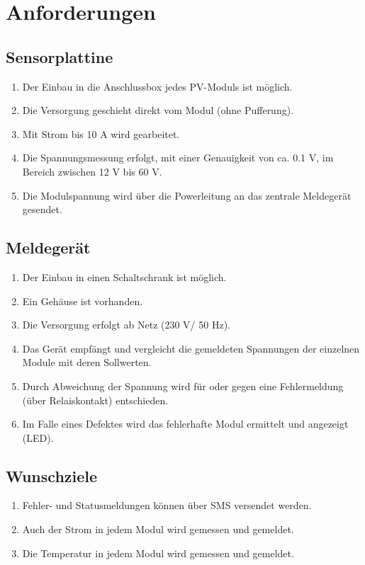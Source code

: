 %
%
%
\section{Anforderungen}

\subsection{Sensorplattine}
\begin{enumerate}
\item Der Einbau in die Anschlussbox jedes PV-Moduls ist möglich.
\item Die Versorgung geschieht direkt vom Modul (ohne Pufferung).
\item Mit Strom bis 10 A wird gearbeitet.
\item	Die Spannungsmessung erfolgt, mit einer Genauigkeit von ca. 0.1 V, im Bereich zwischen 12 V bis 60 V.
\item	Die Modulspannung wird über die Powerleitung an das zentrale Meldegerät gesendet.
\end{enumerate}

\subsection{Meldegerät}
\begin{enumerate}
\item	Der Einbau in einen Schaltschrank ist möglich.
\item	Ein Gehäuse ist vorhanden.
\item	Die Versorgung erfolgt ab Netz (230 V/ 50 Hz).
\item	Das Gerät empfängt und vergleicht die gemeldeten Spannungen der einzelnen Module mit deren Sollwerten.
\item	Durch Abweichung der Spannung wird für oder gegen eine Fehlermeldung (über Relaiskontakt) entschieden.
\item	Im Falle eines Defektes wird das fehlerhafte Modul ermittelt und angezeigt (LED).
\end{enumerate}

\subsection{Wunschziele}
\begin{enumerate}
\item	Fehler- und Statusmeldungen können über SMS versendet werden.
\item	Auch der Strom in jedem Modul wird gemessen und gemeldet.
\item	Die Temperatur in jedem Modul wird gemessen und gemeldet.
\end{enumerate}
%